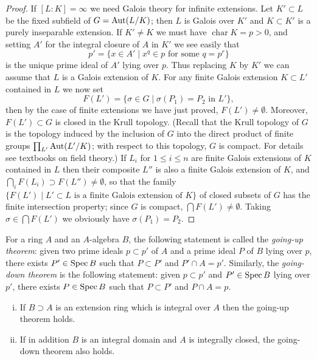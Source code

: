 \begin{proof}
If $[L:K] = \infty$ we need Galois theory for infinite extensions. Let $K' \subset L$ be
the fixed subfield of $G = \operatorname{Aut}(L/K)$; then $L$ is Galois over $K'$ and $K \subset K'$ is a
purely inseparable extension. If $K' \neq K$ we must have $\operatorname{char} K = p > 0$, and
setting $A'$ for the integral closure of $A$ in $K'$ we see easily that
\[
  p' = \{x \in A' \mid x^q \in p \text{ for some } q = p^r\}
\]
is the unique prime ideal of $A'$ lying over $p$. Thus replacing $K$ by $K'$ we can
assume that $L$ is a Galois extension of $K$. For any finite Galois extension
$K \subset L'$ contained in $L$ we now set
\[
  F(L') = \{\sigma \in G \mid \sigma(P_1) = P_2 \text{ in } L'\},
\]
then by the case of finite extensions we have just proved, $F(L') \neq \emptyset$.
Moreover, $F(L') \subset G$ is closed in the Krull topology. (Recall that the Krull
topology of $G$ is the topology induced by the inclusion of $G$ into the direct
product of finite groups $\prod_{L'} \operatorname{Aut}(L'/K)$; with respect to this topology, $G$ is
compact. For details see textbooks on field theory.) If $L_i$ for $1 \le i \le n$ are
finite Galois extensions of $K$ contained in $L$ then their composite $L''$ is
also a finite Galois extension of $K$, and $\bigcap_i F(L_i) \supset F(L'') \neq \emptyset$, so that the
family $\{F(L') \mid L' \subset L \text{ is a finite Galois extension of } K\}$ of closed subsets
of $G$ has the finite intersection property; since $G$ is compact,
$\bigcap F(L') \neq \emptyset$. Taking $\sigma \in \bigcap F(L')$ we obviously have $\sigma(P_1) = P_2$.
\end{proof}

For a ring $A$ and an $A$-algebra $B$, the following statement is called the
\emph{going-up theorem}: given two prime ideals $p \subset p'$ of $A$ and a prime ideal $P$ of $B$
lying over $p$, there exists $P' \in \operatorname{Spec} B$ such that $P \subset P'$ and $P' \cap A = p'$.
Similarly, the \emph{going-down theorem} is the following statement: given $p \subset p'$
and $P' \in \operatorname{Spec} B$ lying over $p'$, there exists $P \in \operatorname{Spec} B$ such that $P \subset P'$ and
$P \cap A = p$.

\begin{theorem}\label{thm:9.4}
\begin{enumerate}[(i)]
  \item If $B \supset A$ is an extension ring which is integral over $A$ then
        the going-up theorem holds.
  \item If in addition $B$ is an integral domain and $A$ is integrally closed, the
        going-down theorem also holds.
\end{enumerate}
\end{theorem}

